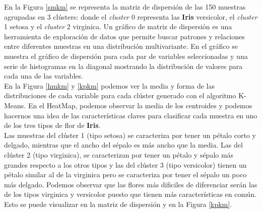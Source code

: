 \documentclass[a4paper, 20pt]{article}
\begin{document}
En la Figura \ref{smkm} se representa la matriz de dispersión de las 150 muestras agrupadas en 3 clústers: donde el \textit{cluster} 0 representa las \textbf{Iris} versicolor, el \textit{cluster} 1 setosa y el \textit{cluster} 2 virginica. Un gráfico de matriz de dispersión es una herramienta de exploración de datos que permite buscar patrones y relaciones entre diferentes muestras en una distribución multivariante. En el gráfico se muestra el gráfico de dispersión para cada par de variables seleccionadas y una serie de histogramas en la diagonal mostrando la distribución de valores para cada una de las variables.\\

En la Figura \ref{hmkm} y \ref{kpkm} podemos ver la media y forma de las distribuciones de cada variable para cada clúster generado con el algoritmo K-Means. En el HeatMap, podemos observar la media de los centroides y podemos hacernos una idea de las características claves para clasificar cada muestra en uno de los tres tipos de flor de \textbf{Iris}.\\

Las muestras del clúster 1 (tipo setosa) se caracteriza por tener un pétalo corto y delgado, mientras que el ancho del sépalo es más ancho que la media. Las del clúster 2 (tipo virginica), se caracterizan por tener un pétalo y sépalo más grandes respecto a los otros tipos y las del clúster 3 (tipo versicolor) tienen un pétalo similar al de la virginica pero se caracteriza por tener el sépalo un poco más delgado. Podemos observar que las flores más dificiles de diferenciar serán las de los tipos virginica y versicolor puesto que tienen más características en común. Esto se puede visualizar en la matriz de dispersión y en la Figura \ref{kpkm}.
\end{document}

